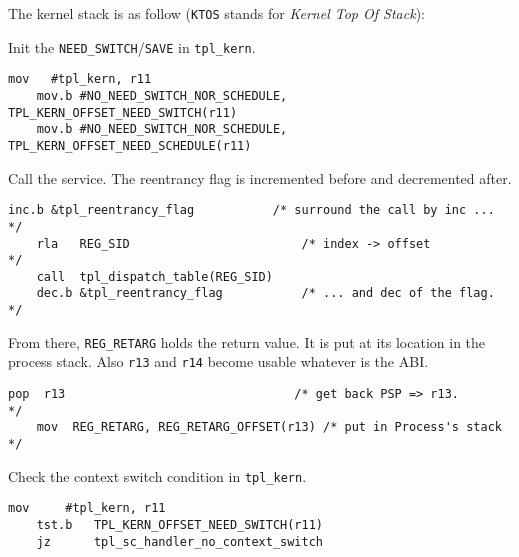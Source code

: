 \documentclass[11pt, oneside]{article}   	%
\begin{document}
The kernel stack is as follow (\texttt{KTOS} stands for \emph{Kernel Top Of Stack}):

\begin{center}
\end{center}

Init the \lstinline{NEED_SWITCH}/\lstinline{SAVE} in \lstinline{tpl_kern}.

\begin{lstlisting}[backgroundcolor=\color{red!15}]
    mov   #tpl_kern, r11
    mov.b #NO_NEED_SWITCH_NOR_SCHEDULE, TPL_KERN_OFFSET_NEED_SWITCH(r11)
    mov.b #NO_NEED_SWITCH_NOR_SCHEDULE, TPL_KERN_OFFSET_NEED_SCHEDULE(r11)
\end{lstlisting}

Call the service. The reentrancy flag is incremented before and decremented after.
 
\begin{lstlisting}[backgroundcolor=\color{red!15}]
    inc.b &tpl_reentrancy_flag           /* surround the call by inc ...  */
    rla   REG_SID                        /* index -> offset               */
    call  tpl_dispatch_table(REG_SID)
    dec.b &tpl_reentrancy_flag           /* ... and dec of the flag.      */
\end{lstlisting}

From there, \lstinline{REG_RETARG} holds the return value. It is put at its location in the process stack. Also \lstinline{r13} and \lstinline{r14} become usable whatever is the ABI.

\begin{lstlisting}[backgroundcolor=\color{red!15}]
    pop  r13                                /* get back PSP => r13.       */
    mov  REG_RETARG, REG_RETARG_OFFSET(r13) /* put in Process's stack     */
\end{lstlisting}

Check the context switch condition in \lstinline{tpl_kern}.

\begin{lstlisting}[backgroundcolor=\color{red!15}]
    mov     #tpl_kern, r11
    tst.b   TPL_KERN_OFFSET_NEED_SWITCH(r11)
    jz      tpl_sc_handler_no_context_switch
\end{lstlisting}
\end{document}

